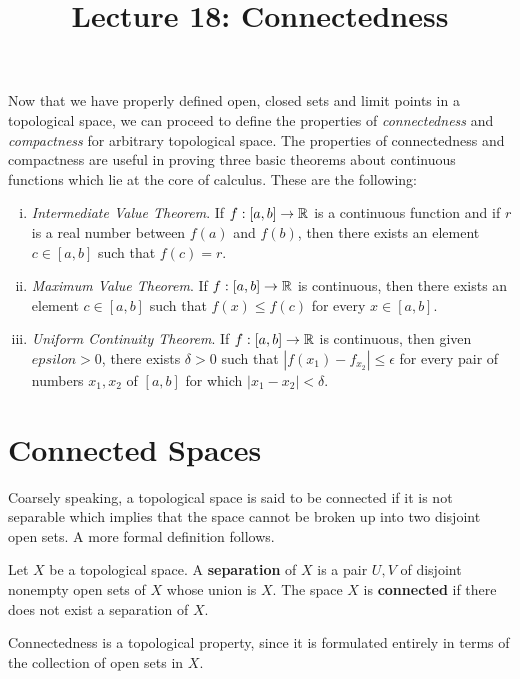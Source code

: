 \documentclass[a4paper,english,12pt]{article}
\title{Lecture 18: Connectedness}
\author{}
\begin{document}
\maketitle

Now that we have properly defined open, closed sets and limit points in a topological space, we can proceed to define the properties of 
\textit{connectedness} and \textit{compactness} for arbitrary topological space. The properties of connectedness and compactness are useful in proving 
three basic theorems about continuous functions which lie at the core of calculus. These are the following:

\begin{enumerate} [i)]
 \item \textit{Intermediate Value Theorem}.  If $f:[a, b] \to \mathbb{R}$ is a continuous function and if $r$ is a real number between $f(a)$ and $f(b)$, then 
 there exists an element $c \in [a, b]$ such that $f(c) = r$.
 
 \item \textit{Maximum Value Theorem}. If $f:[a,b] \to \mathbb{R}$ is continuous, then there exists an element $c \in [a, b]$ such that $f(x) \le f(c)$
 for every $x \in [a, b]$.
 
 \item \textit{Uniform Continuity Theorem}. If $f:[a,b] \to \mathbb{R}$ is continuous, then given $epsilon > 0$, there exists $\delta > 0$ 
 such that $|f(x_{1}) - f_{x_{2}}| \le \epsilon$ for every pair of numbers $x_{1}, x_{2}$ of $[a, b]$ for which $|x_{1} - x_{2}| < \delta$.
\end{enumerate}


\section{Connected Spaces}

Coarsely speaking, a topological space is said to be connected if it is not separable which implies that the space cannot be broken up into two disjoint open sets.
A more formal definition follows.

\begin{defn} 
Let $X$ be a topological space. A \textbf{separation} of $X$ is a pair $U, V$ of disjoint nonempty open sets of $X$ whose union is $X$.
The space $X$ is \textbf{connected} if there does not exist a separation of $X$. 
\end{defn}

Connectedness is a topological property, since it is formulated entirely in terms of the collection of open sets in $X$. 
\end{document}
